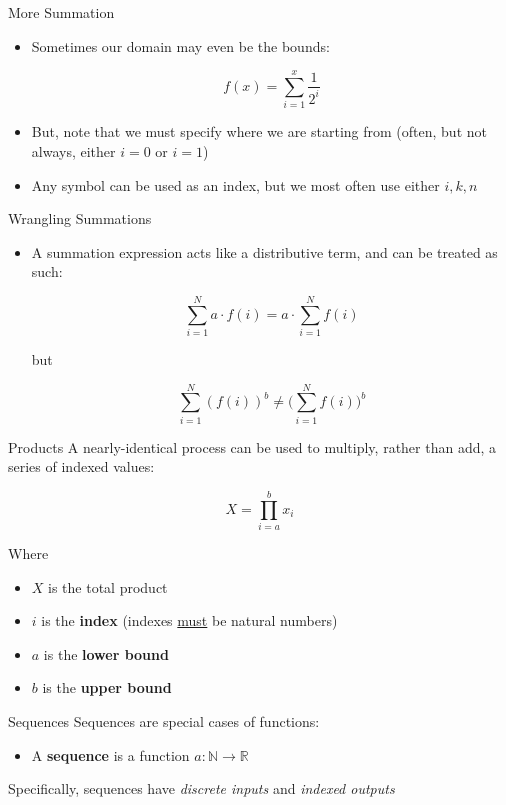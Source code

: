 \documentclass[10pt]{beamer}
\begin{document}
\begin{frame}{More Summation}
\begin{itemize}
    \item Sometimes our domain may even be the bounds:

    \[f(x) = \sum_{i=1}^x \frac{1}{2^i}\]

    \item But, note that we must specify where we are starting from (often, but not always, either $i = 0$ or $i = 1$)
    \item Any symbol can be used as an index, but we most often use either $i,k,n$
\end{itemize}
\end{frame}

\begin{frame}{Wrangling Summations}
\begin{itemize}
    \item A summation expression acts like a distributive term, and can be treated as such:

    \[\sum_{i=1}^{N}  a \cdot f(i) = a \cdot \sum_{i=1}^{N}f(i)\]

    but

    \[\sum_{i=1}^{N} (f(i))^b \neq  \Big( \sum_{i=1}^N f(i) \Big)^b\]
\end{itemize}
\end{frame}

\begin{frame}{Products}
    A nearly-identical process can be used to multiply, rather than add, a series of indexed values:

        \[X = \prod_{i=a}^{b} x_i\]

    Where

    \begin{itemize}
        \item $X$ is the total product
        \item $i$ is the \textbf{index} (indexes \underline{must} be natural numbers)
        \item $a$ is the \textbf{lower bound}
        \item $b$ is the \textbf{upper bound}
    \end{itemize}
\end{frame}

\begin{frame}{Sequences}
    Sequences are special cases of functions:
    
    \begin{itemize}
        \item A \textbf{sequence} is a function $a: \mathbb{N} \rightarrow \mathbb{R}$
    \end{itemize}

    Specifically, sequences have \textit{discrete inputs} and \textit{indexed outputs}
\end{frame}
\end{document}
